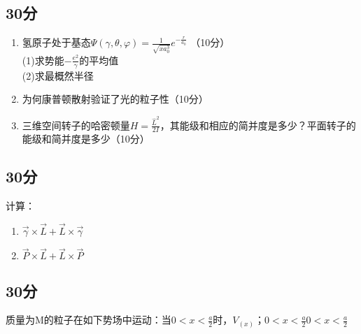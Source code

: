 
\subsection{30分}
\begin{enumerate}
\item 氢原子处于基态$\varPsi(\gamma,\theta,\varphi)=\frac{1}{\sqrt{xa^{3}_{0}}}e^{-\frac{r}{a_0}}$ （10分）\\
(1)求势能$-\frac{e^2}{\gamma}$的平均值\\
(2)求最概然半径\\
\item 为何康普顿散射验证了光的粒子性（10分）\\
\item 三维空间转子的哈密顿量$H=\frac{\hat{L}^2}{2I}$，其能级和相应的简并度是多少？平面转子的能级和简并度是多少（10分）\\
\end{enumerate}
\subsection{30分}
计算：\\
\begin{enumerate}
\item $\vec{\gamma}\times \vec{L}+ \vec{L}\times \vec{\gamma}$
\item $\vec{P}\times\vec{L}+\vec{L}\times\vec{P}$
\end{enumerate}
\subsection{30分}
质量为M的粒子在如下势场中运动：当$0<x<\frac{a}{2}$时，$V_{(x)}$；$0<x<\frac{a}{2}$$0<x<\frac{a}{2}$